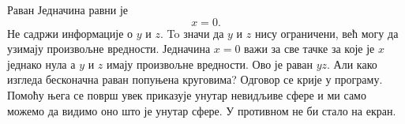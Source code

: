 \begin{surferPage}{Раван}
Једначина равни је \[x=0.\] Не садржи информације о $y$ и $z$. To значи да $y$ и $z$ нису ограничени, већ могу да узимају произвољне вредности.
Једначина $x=0$ важи за све тачке за које је $x$ једнако нула а $y$ и $z$ имају произвољне вредности. Ово је раван $yz$.
\newline \newline
Али како изгледа бесконачна раван попуњена круговима? Одговор се крије у програму. Помоћу њега се површ увек приказује унутар невидљиве сфере и ми само можемо да видимо оно што је унутар сфере. У противном не би стало на екран.
\end{surferPage}
